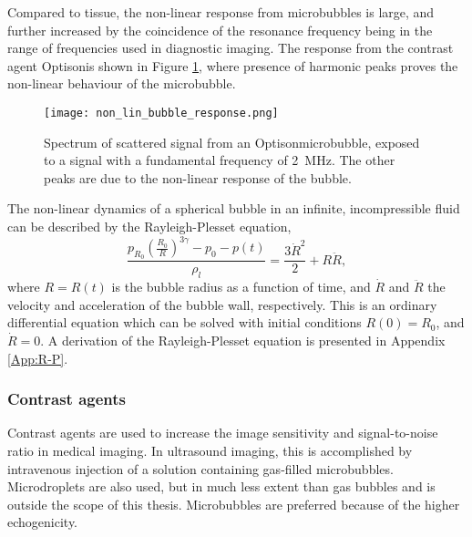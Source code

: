 Compared to tissue, the non-linear response from microbubbles is large, and further increased by the coincidence of the resonance frequency being in the range of frequencies used in diagnostic imaging. The response from the contrast agent Optison\texttrademark  is shown in Figure \ref{Fig:bub_response}, where presence of harmonic peaks proves the non-linear behaviour of the microbubble. 

\begin{figure}[h]
  \centering
  \texttt{[image: non\_lin\_bubble\_response.png]}
  \caption{Spectrum of scattered signal from an Optison\texttrademark microbubble, exposed to a signal with a fundamental frequency of \SI{2}{\mega\hertz}. The other peaks are due to the non-linear response of the bubble\cite{Shi1999}.}
  \label{Fig:bub_response}
\end{figure}
The non-linear dynamics of a spherical bubble in an infinite, incompressible fluid can be described by the Rayleigh-Plesset equation,
\begin{equation}
\label{r-p}
\frac{p_{R_0}\left(\frac{R_0}{R}\right)^{3\gamma}-p_0 - p(t)}{\rho_l} = \frac{3\dot{R}^2}{2}+R\ddot{R},
\end{equation}
where $R = R(t)$ is the bubble radius as a function of time, and $\dot{R}$ and $\ddot{R}$ the velocity and acceleration of the bubble wall, respectively. This is an ordinary differential equation which can be solved with initial conditions $R(0) = R_0$, and $\dot{R} = 0$\cite{Moss2014}. A derivation of the Rayleigh-Plesset equation is presented in Appendix \ref{App:R-P}.

 

\subsubsection{Contrast agents}
\label{contrast agents}

Contrast agents are used to increase the image sensitivity and signal-to-noise ratio in medical imaging. In ultrasound imaging, this is accomplished by intravenous injection of a solution containing gas-filled microbubbles\cite{Paradossi2010}. Microdroplets are also used\cite{Soman2006}, but in much less extent than gas bubbles and is outside the scope of this thesis. Microbubbles are preferred because of the higher echogenicity\cite{Talu2008}.

